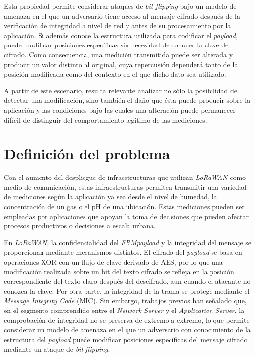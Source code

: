 Esta propiedad permite considerar ataques de \textit{bit flipping} bajo un modelo de amenaza en el que un adversario tiene acceso al mensaje cifrado después de la verificación de integridad a nivel de red y antes de su procesamiento por la aplicación. Si además conoce la estructura utilizada para codificar el \textit{payload}, puede modificar posiciones específicas sin necesidad de conocer la clave de cifrado. Como consecuencia, una medición transmitida puede ser alterada y producir un valor distinto al original, cuya repercusión dependerá tanto de la posición modificada como del contexto en el que dicho dato sea utilizado.

A partir de este escenario, resulta relevante analizar no sólo la posibilidad de detectar una modificación, sino también el daño que ésta puede producir sobre la aplicación y las condiciones bajo las cuales una alteración puede permanecer difícil de distinguir del comportamiento legítimo de las mediciones.

\section{Definición del problema}

Con el aumento del despliegue de infraestructuras que utilizan \textit{LoRaWAN} como medio de comunicación, estas infraestructuras permiten transmitir una variedad de mediciones según la aplicación ya sea desde el nivel de humedad, la concentración de un gas o el pH de una ubicación. Estas mediciones pueden ser empleadas por aplicaciones que apoyan la toma de decisiones que pueden afectar procesos productivos o decisiones a escala urbana. 

En \textit{LoRaWAN}, la confidencialidad del \textit{FRM\textit{payload}} y la integridad del mensaje se proporcionan mediante mecanismos distintos. El cifrado del \textit{\textit{payload}} se basa en operaciones XOR con un flujo de clave derivado de AES, por lo que una modificación realizada sobre un bit del texto cifrado se refleja en la posición correspondiente del texto claro después del descifrado, aun cuando el atacante no conozca la clave. Por otra parte, la integridad de la trama se protege mediante el \textit{Message Integrity Code} (MIC). Sin embargo, trabajos previos han señalado que, en el segmento comprendido entre el \textit{Network Server} y el \textit{Application Server}, la comprobación de integridad no se preserva de extremo a extremo, lo que permite considerar un modelo de amenaza en el que un adversario con conocimiento de la estructura del \textit{\textit{payload}} puede modificar posiciones específicas del mensaje cifrado mediante un ataque de \textit{bit flipping}.

